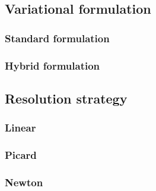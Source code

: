 \subsection{Variational formulation}
\subsubsection{Standard formulation}
\subsubsection{Hybrid formulation}

\subsection{Resolution strategy}
\subsubsection{Linear}
\subsubsection{Picard}
\subsubsection{Newton}
